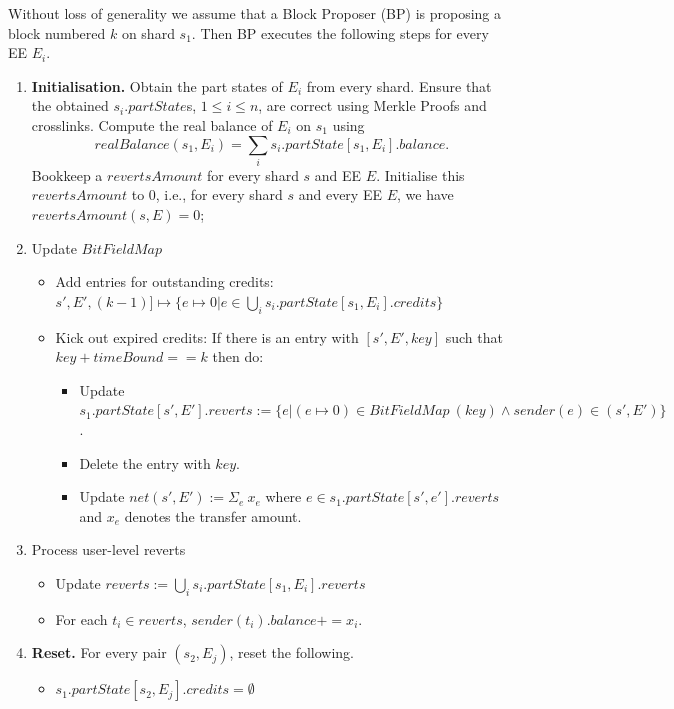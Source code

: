 \documentclass{article}
\newcommand{\bitfieldmap}[0]{\ensuremath{BitFieldMap}~}
\begin{document}
Without loss of generality we assume that a Block Proposer (BP) is proposing a block numbered $k$ on shard $s_1$. Then BP executes the following steps for every EE $E_i$. 

\begin{enumerate}
\item {\bf Initialisation.} Obtain the part states of $E_i$ from every shard. Ensure that the obtained $s_i.partState$s,  $1 \le i \le n$, are correct using Merkle Proofs and crosslinks.
Compute the real balance of $E_i$ on $s_1$ using 
\[
	realBalance(s_1,E_i) = \sum_i s_i.partState[s_1,E_i].balance.
\]
Bookkeep a $revertsAmount$ for every shard $s$ and EE $E$.  Initialise this $revertsAmount$ to $0$, i.e., for every shard $s$ and every EE $E$, we have $revertsAmount(s,E) = 0$;  

\item Update $\bitfieldmap$
    \begin{itemize}
        \item Add entries for outstanding credits: 
        $s', E', (k-1)] \mapsto \{e \mapsto 0 | e \in \bigcup_i s_i.partState[s_1,E_i].credits\}$
        \item Kick out expired credits: If there is an entry with $[s',E',key]$ such that $key + timeBound == k$ then do:
        \begin{itemize}
            \item Update $s_1.partState[s',E'].reverts := \{ e | (e \mapsto 0) \in \bitfieldmap(key) \wedge sender(e) \in (s',E') \}$.
            \item Delete the entry with $key$.
            \item Update $net(s',E') := \Sigma_e ~x_e$ where $e \in s_1.partState[s',e'].reverts$ and $x_e$ denotes the transfer amount.
        \end{itemize}
    \end{itemize}
\item Process user-level reverts
    \begin{itemize}
	    \item Update $reverts := \bigcup_i s_i.partState[s_1,E_i].reverts$
	    \item For each $t_i \in reverts$, $sender(t_i).balance += x_i$.
    \end{itemize}
\item {\bf Reset.} For every pair $(s_2,E_j)$, reset the following.
\begin{itemize}
	\item $s_1.partState[s_2,E_j].credits = \emptyset$

\end{itemize}
\end{enumerate}
\end{document}
